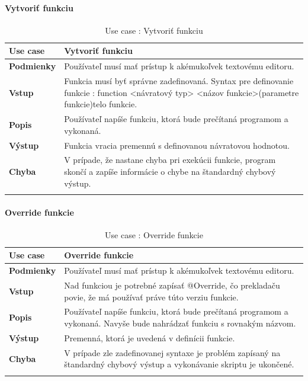 \paragraph{Vytvoriť funkciu}
\begin{center}
	\begin{longtable}{|p{2.5cm}|p{12.2cm}|}
		
			\hline
			\textbf{Use case} & Vytvoriť funkciu \\ 
			\hline
			\textbf{Podmienky} & Používateľ musí mať prístup k akémukoľvek textovému editoru.  \\ 
			\hline
			\textbf{Vstup} & Funkcia musí byť správne zadefinovaná. 
			Syntax pre definovanie funkcie : 
			\newline
			function <návratový typ> <názov funkcie>(parametre funkcie){telo funkcie}. \\
			\hline
			
			\textbf{Popis} & Používateľ napíše funkciu, ktorá bude prečítaná programom a vykonaná.\\ 
			\hline

			\textbf{Výstup} & Funkcia vracia premennú s definovanou návratovou hodnotou.\\
			\hline
			\textbf{Chyba} & V prípade, že nastane chyba pri exekúcii funkcie, program skončí a zapíše informácie o chybe na štandardný chybový výstup.\\
			\hline
		\caption{Use case : Vytvoriť funkciu}
		\label{table:1}
		
	\end{longtable}
\end{center}
\paragraph{Override funkcie}
\begin{center}
	\begin{longtable}{|p{2.5cm}|p{12.2cm}|}
		
			\hline
			\textbf{Use case} & Override funkcie \\ 
			\hline
			\textbf{Podmienky} & Používateľ musí mať prístup k akémukoľvek textovému editoru.  \\ 
			\hline
			\textbf{Vstup} & Nad funkciou je potrebné zapísať @Override,  čo prekladaču povie, že má používať práve túto verziu funkcie.\\
			\hline
			
			\textbf{Popis} & Používateľ napíše funkciu, ktorá bude prečítaná programom a vykonaná. Navyše bude nahrádzať funkciu s rovnakým názvom.\\ 
			\hline
			\textbf{Výstup} & Premenná, ktorá je uvedená v definícii funkcie.\\
			\hline
			\textbf{Chyba} & V prípade zle zadefinovanej syntaxe je problém zapísaný na štandardný chybový výstup a vykonávanie skriptu je ukončené.\\
			\hline
		\caption{Use case : Override funkcie}
		\label{table:1}
		
	\end{longtable}
\end{center}
